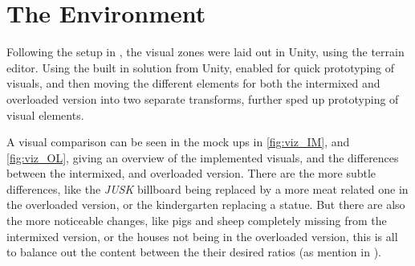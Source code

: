 \section{The Environment}
Following the setup in , the visual zones were laid out in Unity, using the terrain editor. Using the built in solution from Unity, enabled for quick prototyping of visuals, and then moving the different elements for both the intermixed and overloaded version into two separate transforms, further sped up prototyping of visual elements.

A visual comparison can be seen in the mock ups in \autoref{fig:viz_IM}, and \autoref{fig:viz_OL}, giving an overview of the implemented visuals, and the differences between the intermixed, and overloaded version. There are the more subtle differences, like the \textit{JUSK} billboard being replaced by a more meat related one in the overloaded version, or the kindergarten replacing a statue. But there are also the more noticeable changes, like pigs and sheep completely missing from the intermixed version, or the houses not being in the overloaded version, this is all to balance out the content between the their desired ratios (as mention in ).

